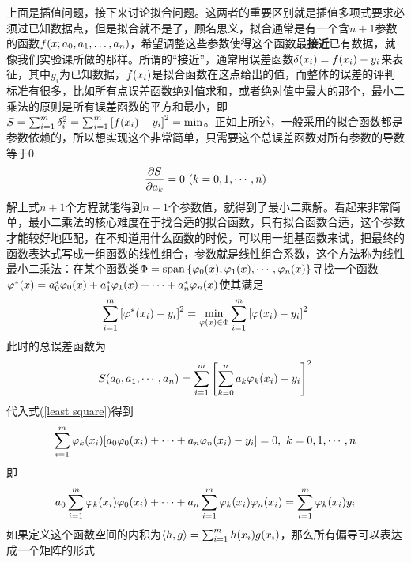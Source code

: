 \documentclass[12pt,a4paper,openany,twoside]{book}
\numberwithin{equation}{section}
\newcommand{\mean}[1]{\left\langle #1 \right\rangle}
\begin{document}
      上面是插值问题，接下来讨论拟合问题。这两者的重要区别就是插值多项式要求必须过已知数据点，但是拟合就不是了，顾名思义，拟合通常是有一个含$n+1$参数的函数$f\qty(x;a_0,a_1,\dots,a_n)$，希望调整这些参数使得这个函数最\textbf{接近}已有数据，就像我们实验课所做的那样。所谓的“接近”，通常用误差函数$\delta\qty(x_i)=f\qty(x_i)-y_i$来表征，其中$y_i$为已知数据，$f\qty(x_i)$是拟合函数在这点给出的值，而整体的误差的评判标准有很多，比如所有点误差函数绝对值求和，或者绝对值中最大的那个，最小二乘法的原则是所有误差函数的平方和最小，即$S=\sum_{i=1}^m{\delta_i^2}=\sum_{i=1}^m{\qty[f\qty(x_{i})-y_{i}]^{2}}=\min$。正如上所述，一般采用的拟合函数都是参数依赖的，所以想实现这个非常简单，只需要这个总误差函数对所有参数的导数等于0
      \begin{equation}
        \pdv{S}{a_k}=0\ \qty(k=0,1,\cdots,n)
        \label{least square}
      \end{equation}
      解上式$n+1$个方程就能得到$n+1$个参数值，就得到了最小二乘解。看起来非常简单，最小二乘法的核心难度在于找合适的拟合函数，只有拟合函数合适，这个参数才能较好地匹配，在不知道用什么函数的时候，可以用一组基函数来试，把最终的函数表达式写成一组函数的线性组合，参数就是线性组合系数，这个方法称为线性最小二乘法：在某个函数类$\Phi=\operatorname{span}\qty{\varphi_0\qty(x),\varphi_1\qty(x),\cdots,\varphi_n\qty(x)}$寻找一个函数$\varphi^*\qty(x)=a_0^*\varphi_0\qty(x)+a_1^*\varphi_1\qty(x)+\cdots+a_n^*\varphi_n\qty(x)$使其满足
      \begin{equation}
        \sum_{i=1}^m{\qty[\varphi^*\qty(x_i)-y_i]^2}=\min_{\varphi\qty(x)\in\Phi}\sum_{i=1}^m{\qty[\varphi\qty(x_i)-y_i]^2}
      \end{equation}
      此时的总误差函数为
      \begin{equation}
        S\qty(a_0,a_1,\cdots,a_n)=\sum_{i=1}^m{\qty[\sum_{k=0}^n{a_k\varphi_k\qty(x_i)}-y_i]^2}
      \end{equation}
      代入式(\ref{least square})得到
      \begin{equation}
        \sum_{i=1}^m{\varphi_k\qty(x_i)\qty[a_0\varphi_0\qty(x_i)+\cdots+a_n\varphi_n\qty(x_i)-y_i]}=0,\ k=0,1,\cdots,n
      \end{equation}
      即
      \begin{equation}
        a_0\sum_{i=1}^m{\varphi_k\qty(x_i)\varphi_0\qty(x_i)}+\cdots+a_n\sum_{i=1}^m{\varphi_k\qty(x_i)\varphi_n\qty(x_i)}=\sum_{i=1}^m{\varphi_k\qty(x_i)y_i}
      \end{equation}
      如果定义这个函数空间的内积为$\mean{h,g}=\sum_{i=1}^m{h\qty(x_i)g\qty(x_i)}$，那么所有偏导可以表达成一个矩阵的形式
\end{document}
